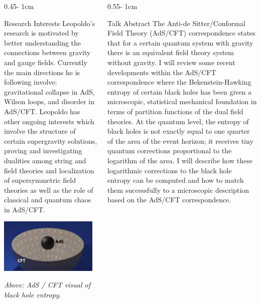 \documentclass{../psuposter}
\begin{document}
\begin{frame}
\begin{columns}[t, totalwidth=\textwidth]
\begin{column}{0.45\textwidth - 1cm}
    \begin{block}{Research Interests}
        Leopoldo's research is motivated by better understanding the connections between gravity and gauge fields. Currently the main directions he is following involve: gravitational collapse in AdS, Wilson loops, and disorder in AdS/CFT. Leopoldo has other ongoing interests which involve the structure of certain supergravity solutions, proving and investigating dualities among string and field theories and localization of supersymmetric field theories as well as the role of classical and quantum chaos in AdS/CFT. \cite{LeopoldoPandoZayas}
        \begin{center}
	    	\includegraphics[width=0.95\textwidth]{images/ads-cft-blackhole}    		
    	\end{center}
    	\textit{Above: AdS / CFT visual of black hole entropy}. \cite{zayasMicroscopicAccountBlack2020}
    \end{block}
\end{column}
\begin{column}{0.55\textwidth - 1cm}


    \begin{block}{Talk Abstract}
        The Anti-de Sitter/Conformal Field Theory (AdS/CFT) correspondence states that for a certain quantum system with gravity there is an equivalent field theory system without gravity.  I will review some recent developments within the AdS/CFT correspondence where the Bekenstein-Hawking entropy of certain black holes has been given a microscopic, statistical mechanical foundation in terms of partition functions of the dual field theories. At the quantum level, the entropy of black holes is not exactly equal to one quarter of the area of the event horizon; it receives tiny quantum corrections proportional to the logarithm of the area. I will describe how these logarithmic corrections to the black hole entropy can be computed and how to match them successfully to a microscopic description based on the AdS/CFT correspondence.  
    \end{block}



\end{column}
\end{columns}
\end{frame}
\end{document}
